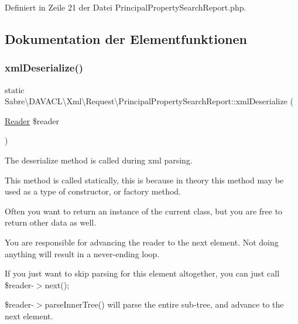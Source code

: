 Definiert in Zeile 21 der Datei Principal\+Property\+Search\+Report.\+php.



\subsection{Dokumentation der Elementfunktionen}
\mbox{\label{class_sabre_1_1_d_a_v_a_c_l_1_1_xml_1_1_request_1_1_principal_property_search_report_adcdda4157381d5c0586f4b3ebc74aab7}} 
\subsubsection{\texorpdfstring{xml\+Deserialize()}{xmlDeserialize()}}
{\footnotesize\ttfamily static Sabre\textbackslash{}\+D\+A\+V\+A\+C\+L\textbackslash{}\+Xml\textbackslash{}\+Request\textbackslash{}\+Principal\+Property\+Search\+Report\+::xml\+Deserialize (\begin{DoxyParamCaption}\item[{\mbox{\hyperlink{class_sabre_1_1_xml_1_1_reader}{Reader}}}]{\$reader }\end{DoxyParamCaption})\hspace{0.3cm}{\ttfamily [static]}}

The deserialize method is called during xml parsing.

This method is called statically, this is because in theory this method may be used as a type of constructor, or factory method.

Often you want to return an instance of the current class, but you are free to return other data as well.

You are responsible for advancing the reader to the next element. Not doing anything will result in a never-\/ending loop.

If you just want to skip parsing for this element altogether, you can just call \$reader-\/$>$next();

\$reader-\/$>$parse\+Inner\+Tree() will parse the entire sub-\/tree, and advance to the next element.


